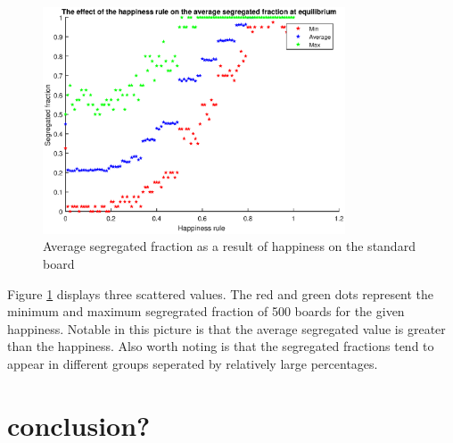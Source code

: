 \documentclass{article}
\begin{document}
\begin{figure}[h!]
    \centering
    \includegraphics[width=0.8\textwidth]{habysegfrac_sb_1}
    \caption{Average segregated fraction as a result of happiness on the standard board}
    \label{fig:happysegsb}
\end{figure}

Figure \ref{fig:happysegsb} displays three scattered values. The red and green dots represent the minimum and maximum segregrated fraction of 500 boards for the given happiness. Notable in this picture is that the average segregated value is greater than the happiness. 
Also worth noting is that the segregated fractions tend to appear in different groups seperated by relatively large percentages.
\section{conclusion?}
\end{document}
